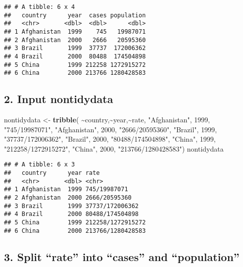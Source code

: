 \documentclass[
]{article}
\newenvironment{Shaded}{\begin{snugshade}}{\end{snugshade}}
\newcommand{\DecValTok}[1]{\textcolor[rgb]{0.00,0.00,0.81}{#1}}
\newcommand{\FunctionTok}[1]{\textcolor[rgb]{0.13,0.29,0.53}{\textbf{#1}}}
\newcommand{\NormalTok}[1]{#1}
\newcommand{\OtherTok}[1]{\textcolor[rgb]{0.56,0.35,0.01}{#1}}
\newcommand{\SpecialCharTok}[1]{\textcolor[rgb]{0.81,0.36,0.00}{\textbf{#1}}}
\newcommand{\StringTok}[1]{\textcolor[rgb]{0.31,0.60,0.02}{#1}}
\begin{document}
\begin{verbatim}
## # A tibble: 6 x 4
##   country      year  cases population
##   <chr>       <dbl>  <dbl>      <dbl>
## 1 Afghanistan  1999    745   19987071
## 2 Afghanistan  2000   2666   20595360
## 3 Brazil       1999  37737  172006362
## 4 Brazil       2000  80488  174504898
## 5 China        1999 212258 1272915272
## 6 China        2000 213766 1280428583
\end{verbatim}

\hypertarget{input-nontidydata}{%
\subsection{2. Input nontidydata}\label{input-nontidydata}}

\begin{Shaded}
\begin{Highlighting}[]
\NormalTok{nontidydata }\OtherTok{\textless{}{-}} \FunctionTok{tribble}\NormalTok{(}
\SpecialCharTok{\textasciitilde{}}\NormalTok{country,}\SpecialCharTok{\textasciitilde{}}\NormalTok{year,}\SpecialCharTok{\textasciitilde{}}\NormalTok{rate,}
\StringTok{"Afghanistan"}\NormalTok{, }\DecValTok{1999}\NormalTok{, }\StringTok{"745/19987071"}\NormalTok{,}
\StringTok{"Afghanistan"}\NormalTok{, }\DecValTok{2000}\NormalTok{, }\StringTok{"2666/20595360"}\NormalTok{,}
\StringTok{"Brazil"}\NormalTok{, }\DecValTok{1999}\NormalTok{, }\StringTok{"37737/172006362"}\NormalTok{,}
\StringTok{"Brazil"}\NormalTok{, }\DecValTok{2000}\NormalTok{, }\StringTok{"80488/174504898"}\NormalTok{,}
\StringTok{"China"}\NormalTok{, }\DecValTok{1999}\NormalTok{, }\StringTok{"212258/1272915272"}\NormalTok{,}
\StringTok{"China"}\NormalTok{, }\DecValTok{2000}\NormalTok{, }\StringTok{"213766/1280428583"}\NormalTok{)}
\NormalTok{nontidydata}
\end{Highlighting}
\end{Shaded}

\begin{verbatim}
## # A tibble: 6 x 3
##   country      year rate             
##   <chr>       <dbl> <chr>            
## 1 Afghanistan  1999 745/19987071     
## 2 Afghanistan  2000 2666/20595360    
## 3 Brazil       1999 37737/172006362  
## 4 Brazil       2000 80488/174504898  
## 5 China        1999 212258/1272915272
## 6 China        2000 213766/1280428583
\end{verbatim}

\hypertarget{split-rate-into-cases-and-population}{%
\subsection{3. Split ``rate'' into ``cases'' and
``population''}\label{split-rate-into-cases-and-population}}
\end{document}

